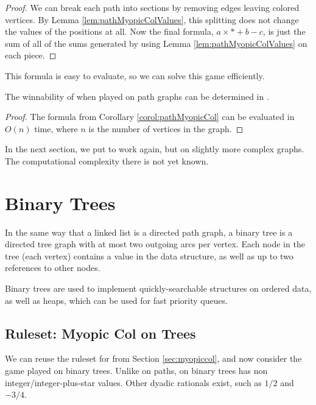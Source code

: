 \documentclass[letter,10pt]{article}
\begin{document}
\begin{proof}
    We can break each path into sections by removing edges leaving colored vertices.  By Lemma \ref{lem:pathMyopicColValues}, this splitting does not change the values of the positions at all.  Now the final formula, $a \times * + b - c$, is just the sum of all of the sums generated by using Lemma \ref{lem:pathMyopicColValues} on each piece.
\end{proof}

This formula is easy to evaluate, so we can solve this game efficiently.

\begin{corollary}
    The winnability of  when played on path graphs can be determined in .
\end{corollary}

\begin{proof}
    The formula from Corollary \ref{corol:pathMyopicCol} can be evaluated in $O(n)$ time, where $n$ is the number of vertices in the graph.
\end{proof}

In the next section, we put  to work again, but on slightly more complex graphs.  The computational complexity there is not yet known.

\section{Binary Trees}
\label{section:binary-trees}

In the same way that a linked list is a directed path graph, a binary tree is a directed tree graph with at most two outgoing arcs per vertex.  Each node in the tree (each vertex) contains a value in the data structure, as well as up to two references to other nodes.

Binary trees are used to implement quickly-searchable structures on ordered data, as well as heaps, which can be used for fast priority queues.

\subsection{Ruleset: Myopic Col on Trees}

We can reuse the ruleset for  from Section \ref{sec:myopiccol}, and now consider the game played on binary trees.  Unlike on paths,  on binary trees has non integer/integer-plus-star values.  Other dyadic rationals exist, such as $1/2$ and $-3/4$.
\end{document}
